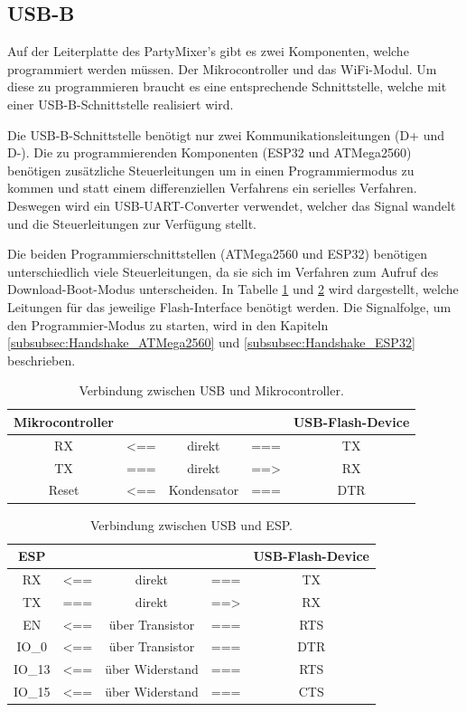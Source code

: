 \subsection{USB-B}
\label{subsec:USB-B}

Auf der Leiterplatte des PartyMixer's gibt es zwei Komponenten, welche programmiert werden müssen. Der Mikrocontroller und das WiFi-Modul. Um diese zu programmieren braucht es eine entsprechende Schnittstelle, welche mit einer USB-B-Schnittstelle realisiert wird.

Die USB-B-Schnittstelle benötigt nur zwei Kommunikationsleitungen (D+ und D-). Die zu programmierenden Komponenten (ESP32 und ATMega2560) benötigen zusätzliche Steuerleitungen um in einen Programmiermodus zu kommen und statt einem differenziellen Verfahrens ein serielles Verfahren. Deswegen wird ein USB-UART-Converter verwendet, welcher das Signal wandelt und die Steuerleitungen zur Verfügung stellt.

Die beiden Programmierschnittstellen (ATMega2560 und ESP32) benötigen unterschiedlich viele Steuerleitungen, da sie sich im Verfahren zum Aufruf des Download-Boot-Modus unterscheiden. In Tabelle \ref{tab:USB_uC} und \ref{tab:USB_ESP} wird dargestellt, welche Leitungen für das jeweilige Flash-Interface benötigt werden. Die Signalfolge, um den Programmier-Modus zu starten, wird in den Kapiteln \ref{subsubsec:Handshake_ATMega2560} und \ref{subsubsec:Handshake_ESP32} beschrieben.

\begin{table}[h!]
\center
\begin{tabular}{|c|lcl|c|}
\hline
\textbf{Mikrocontroller} & & & & \textbf{USB-Flash-Device} \\ \hline
RX & <== & direkt & === & TX  \\
TX & === & direkt & ==> & RX  \\
Reset & <== & Kondensator & === & DTR \\
\hline
\end{tabular}
\caption{Verbindung zwischen USB und Mikrocontroller.}
\label{tab:USB_uC}
\end{table}

\begin{table}[h!]
\center
\begin{tabular}{|c|lcl|c|}
\hline
\textbf{ESP} & & & & \textbf{USB-Flash-Device} \\ \hline
RX & <== & direkt & === & TX  \\
TX & === & direkt & ==> & RX  \\
EN & <== & über Transistor & === & RTS \\
IO\_0 & <== & über Transistor & === & DTR \\
IO\_13 & <== & über Widerstand & === & RTS \\
IO\_15 & <== & über Widerstand & === & CTS \\
\hline
\end{tabular}
\caption{Verbindung zwischen USB und ESP.}
\label{tab:USB_ESP}
\end{table}

